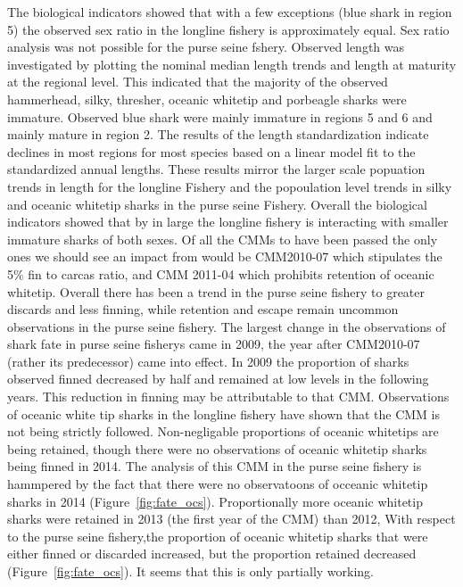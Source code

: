 \documentclass[12pt]{SCreport}
\begin{document}

The biological indicators showed that with a few exceptions (blue shark in region 5) the observed
sex ratio in the longline fishery is approximately equal. Sex ratio analysis was not possible for
the purse seine fshery. Observed length was investigated by plotting the nominal median length
trends and length at maturity at the regional level. This indicated that the majority of the observed
hammerhead, silky, thresher, oceanic whitetip and porbeagle sharks were immature. Observed blue
shark were mainly immature in regions 5 and 6 and mainly mature in region 2. The results of the
length standardization indicate declines in most regions for most species based on a linear model fit
to the standardized annual lengths. These results mirror the larger scale popuation trends in length
for the longline Fishery and the popoulation level trends in silky and oceanic whitetip sharks in the
purse seine Fishery. Overall the biological indicators showed that by in large the longline fishery is
interacting with smaller immature sharks of both sexes.
%
%
%
Of all the CMMs to have been passed the only ones we should see an impact from would be CMM2010-07 which stipulates the 5\% fin to carcas ratio, and CMM 2011-04 which prohibits retention of oceanic whitetip. 
Overall there has been a trend in the purse seine fishery to greater discards and less finning, while retention and escape remain  uncommon observations in the purse seine fishery.
The largest change in the observations of shark fate in purse seine fisherys came in 2009, the year after CMM2010-07 (rather its predecessor) came into effect.  In 2009 the proportion of sharks observed finned decreased by half and remained at low levels in the following years.  This reduction in finning may be attributable to that CMM.   
Observations of  oceanic white tip sharks in the  longline  fishery have shown that the CMM is not being strictly followed. 
Non-negligable proportions of oceanic whitetips are being retained, though there were no observations of oceanic whitetip sharks being finned in 2014.  The analysis of this CMM in the purse seine fishery is hammpered by the fact that there were no observatoons of occeanic whitetip sharks in 2014  (Figure~\ref{fig:fate_ocs}).  
Proportionally  more oceanic whitetip sharks were retained in 2013 (the first year of the CMM) than 2012,   With respect to the purse seine fishery,the proportion of oceanic whitetip sharks that were either finned or discarded increased, but the proportion retained decreased (Figure~\ref{fig:fate_ocs}).  It seems that this is only partially working.
\end{document}
